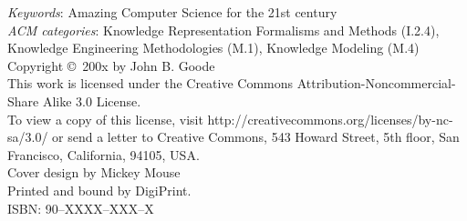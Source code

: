 {\vfill

%

\noindent%
\textsl{Keywords}: Amazing Computer Science for the 21st century \\[2ex]          %
\textsl{ACM categories}: Knowledge Representation Formalisms and Methods (I.2.4), Knowledge Engineering Methodologies (M.1), Knowledge Modeling (M.4)                            %
\\[6ex]                                            %

%
\noindent%
Copyright \copyright\ 200x by John B. Goode\\[2ex] 		%
This work is licensed under the Creative Commons Attribution-Noncommercial-Share Alike 3.0 License.\\ %
To view a copy of this license, visit http://creativecommons.org/licenses/by-nc-sa/3.0/ or send a letter to Creative Commons, 543 Howard Street, 5th floor, San Francisco, California, 94105, USA. \\[2ex]  %
Cover design by Mickey Mouse \\[1ex]           %
Printed and bound by DigiPrint.\\[2ex]           %
ISBN: 90--XXXX--XXX--X                              %

\clearpage
} %

